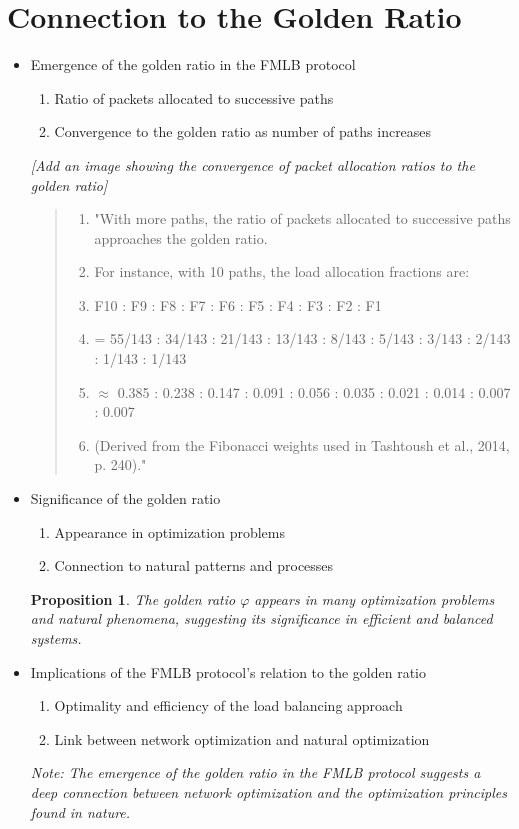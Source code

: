 \documentclass{article}
\newtheorem{proposition}{Proposition}
\begin{document}
\section{Connection to the Golden Ratio}
\begin{itemize}
    \item Emergence of the golden ratio in the FMLB protocol
    \begin{enumerate}
        \item Ratio of packets allocated to successive paths
        \item Convergence to the golden ratio as number of paths increases
    \end{enumerate}
    \textit{[Add an image showing the convergence of packet allocation ratios to the golden ratio]}
    \begin{quote}
        \begin{enumerate}[label=(\arabic*)]
            \item "With more paths, the ratio of packets allocated to successive paths approaches the golden ratio.
            \item For instance, with 10 paths, the load allocation fractions are:
            \item F10 : F9 : F8 : F7 : F6 : F5 : F4 : F3 : F2 : F1
            \item = 55/143 : 34/143 : 21/143 : 13/143 : 8/143 : 5/143 : 3/143 : 2/143 : 1/143 : 1/143
            \item $\approx$ 0.385 : 0.238 : 0.147 : 0.091 : 0.056 : 0.035 : 0.021 : 0.014 : 0.007 : 0.007
            \item (Derived from the Fibonacci weights used in Tashtoush et al., 2014, p. 240)."
        \end{enumerate}
    \end{quote}
    \item Significance of the golden ratio
    \begin{enumerate}
        \item Appearance in optimization problems
        \item Connection to natural patterns and processes
    \end{enumerate}
    \begin{proposition}
        The golden ratio $\varphi$ appears in many optimization problems and natural phenomena, suggesting its significance in efficient and balanced systems.
    \end{proposition}
    \item Implications of the FMLB protocol's relation to the golden ratio
    \begin{enumerate}
        \item Optimality and efficiency of the load balancing approach
        \item Link between network optimization and natural optimization
    \end{enumerate}
    \textit{Note: The emergence of the golden ratio in the FMLB protocol suggests a deep connection between network optimization and the optimization principles found in nature.}
\end{itemize}
\end{document}
